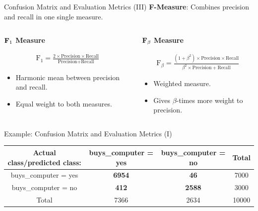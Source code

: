 \begin{frame}{Confusion Matrix and Evaluation Metrics (III)}
	\textbf{F-Measure}: Combines precision and recall in one single measure.

	\begin{columns}
		\begin{column}{0.5\textwidth}
			\begin{center}
				\textbf{$\text{\textbf{F}}_1$ Measure}
			\end{center}
			\begin{align}
				\text{F}_1 = \frac{2 \times \text{Precision} \times \text{Recall}}{\text{Precision} + \text{Recall}}
			\end{align}

			\begin{itemize}
				\item Harmonic mean between precision and recall.
				\item Equal weight to both measures.
			\end{itemize}
		\end{column}

		\begin{column}{0.5\textwidth}
			\begin{center}
				\textbf{$\text{\textbf{F}}_\beta$ Measure}
			\end{center}
			\vspace*{-.5em}
			\begin{align}
				\text{F}_\beta = \frac{(1 + \beta^2) \times \text{Precision} \times \text{Recall}}{\beta^2 \times \text{Precision} + \text{Recall}}
			\end{align}

			\begin{itemize}
				\item Weighted measure.
				\item Gives $\beta$-times more weight to precision.
			\end{itemize}
		\end{column}
	\end{columns}
\end{frame}

\begin{frame}{Example: Confusion Matrix and Evaluation Metrics (I)}
	\begin{itemize}
		\begin{tabular}{|c|c|c|c|}
			\hline
			Actual class/predicted class: & buys\_computer = yes & buys\_computer = no & Total \\\hline
			buys\_computer = yes          & \textbf{6954}        & \textbf{46}         & 7000  \\\hline
			buys\_computer = no           & \textbf{412}         & \textbf{2588}       & 3000  \\\hline
			Total                         & 7366                 & 2634                & 10000 \\\hline
		\end{tabular}
	\end{itemize}
\end{frame}


